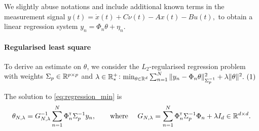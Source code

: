 \documentclass{article}
\begin{document}
We slightly abuse notations and include additional known terms in the measurement signal
$
    y(t) = \dot{x}(t) + C\nu(t) - A x(t) - Bu(t),
$ 
to obtain a linear regression system
$
y_n = \Phi_n\theta + \eta_n.
$

\paragraph{Regularised least square} To derive an estimate on $\theta$, we consider the $L_2$-regularised regression problem with weights $\Sigma_p\in\mathbb{R}^{p\times p}$ and $\lambda\in\mathbb{R}^+_*$:\hfill
$
    \min_{\theta\in\Real^d} \sum_{n=1}^N \|y_n -\Phi_n\theta\|_{\Sigma_p^{-1}}^2 + \lambda\|\theta\|_{}^2.
    \refstepcounter{equation}~(\theequation)\label{eq:regression_min}
$



\begin{proposition}
\label{prop:regularized_solution}
The solution to \eqref{eq:regression_min} is
\begin{align}
    \label{eq:vector_rls}
    \theta_{N,\lambda} = G_{N, \lambda}^{-1} \sum_{n=1}^N \Phi_n^{\mathsf{\scriptscriptstyle T}} \Sigma_p^{-1} y_n,\qquad
    \text{where }\quad G_{N, \lambda} = \sum_{n=1}^N \Phi_{n}^{\mathsf{\scriptscriptstyle T}}\Sigma_p^{-1}\Phi_{n}  + \lambda I_d \in \mathbb{R}^{d\times d}.
\end{align}
\end{proposition}
\end{document}
